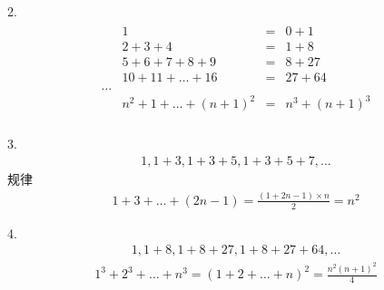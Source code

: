	2. 
	\begin{gather*}
		\begin{aligned}
		&1			&=&0+1	\\
		&2+3+4		&=&1+8	\\
		&5+6+7+8+9	&=&8+27	\\
		&10+11+\dots+16	&=&27+64 \\
		\dots \\
		&n^2+1 + \dots + (n+1)^2 &=& n^3+(n+1)^3\\
		\end{aligned}
	\end{gather*}
	
	3.
	\begin{gather*}
		1,1+3,1+3+5,1+3+5+7,\dots
	\end{gather*}
	规律\\
	\begin{gather*}
		1+3+\dots +(2n-1) = \frac{(1+2n-1)\times n}{2} = n^2
	\end{gather*}
	
	4.
	\begin{gather*}
		1,1+8,1+8+27,1+8+27+64, \dots
	\end{gather*}
	\begin{gather*}
		1^3+2^3+\dots + n^3 = (1+2+\dots+n)^2 = \frac{n^2(n+1)^2}{4}
	\end{gather*}

	
